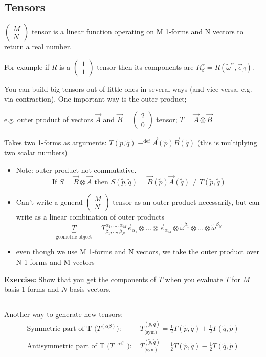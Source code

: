 \documentclass[a4paper]{article} %
\newcommand{\exercise}[2]
{
\begin{framed}
\textbf{Exercise:} #1 \\\hrule
#2
\end{framed}
}
\newcommand{\pmx}[1]{
\begin{pmatrix}
#1
\end{pmatrix}
}
\renewcommand{\tilde}{\widetilde}
\begin{document}
\subsection{Tensors}
$\pmx{M\\N}$ tensor is a linear function operating on M 1-forms and N vectors to return a real number. 

For example if $R$ is a $\pmx{1\\1}$ tensor then its components are $R^{\alpha}_{\beta}=R(\tilde{\omega}^{\alpha},\vec{e}_{\beta})$.

You can build big tensors out of little ones in several ways (and vice versa, e.g. via contraction). One important way is the outer product; 

e.g. outer product of vectors $\vec{A}$ and $\vec{B}=\pmx{2\\0}$ tensor; $T=\vec{A}\otimes \vec{B}$

Takes two 1-forms as arguments: $T(\tilde{p},\tilde{q}) \equiv^{\text{def}}\vec{A}(\tilde{p})\vec{B}(\tilde{q})$ (this is multiplying two scalar numbers)

\begin{itemize}
\item Note: outer product not commutative.
\begin{equation}
\text{If } S=\vec{B}\otimes \vec{A} \text{ then } S(\tilde{p},\tilde{q})=\vec{B}(\tilde{p})\vec{A}(\tilde{q})\neq T(\tilde{p},\tilde{q})
\end{equation}
\item Can't write a general $\pmx{M\\N}$ tensor as an outer product necessarily, but can write as a linear combination of outer products
\begin{equation}
\underbrace{T}_{\text{geometric object}}=T^{\alpha_{1},\ldots,\alpha_{M}}_{\beta_{1},\ldots,\beta_{N}}\vec{e}_{\alpha_{1}}\otimes\ldots\otimes \vec{e}_{\alpha_{M}}\otimes \tilde{\omega}^{\beta_{1}}\otimes\ldots\otimes\tilde{\omega}^{\beta_{N}}
\end{equation}
\item even though we use M 1-forms and N vectors, we take the outer product over N 1-forms and M vectors
\end{itemize}

\exercise{Show that you get the components of $T$ when you evaluate $T$ for $M$ basis 1-forms and $N$ basis vectors.}{}

Another way to generate new tensors:
\begin{align*}
\text{Symmetric part of T ($T^{(\alpha\beta)}$): }& T_{\text{(sym)}}^{(\tilde{p},\tilde{q})}=\frac{1}{2}T(\tilde{p},\tilde{q})+\frac{1}{2}T(\tilde{q},\tilde{p})\\
\text{Antisymmetric part of T ($T^{[\alpha\beta]}$): }& T_{\text{(sym)}}^{(\tilde{p},\tilde{q})}=\frac{1}{2}T(\tilde{p},\tilde{q})-\frac{1}{2}T(\tilde{q},\tilde{p})\\
\end{align*}
\end{document}
